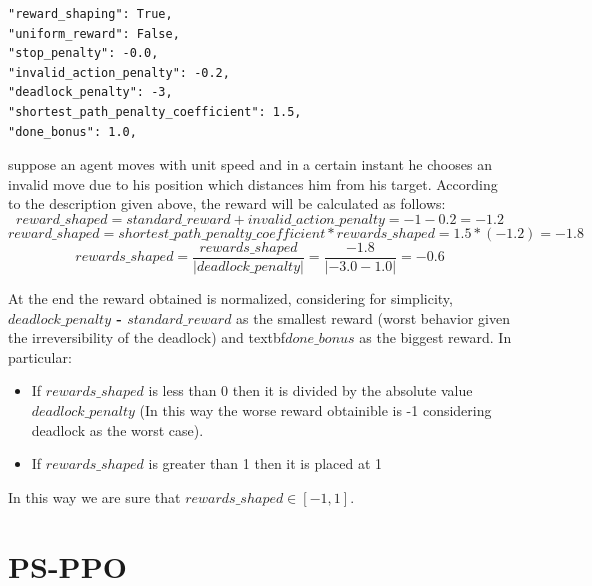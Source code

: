\documentclass[11pt, a4paper, hidelinks]{report}
\begin{document}
\begin{lstlisting}[label={lst:rewards-params}]
"reward_shaping": True,
"uniform_reward": False,
"stop_penalty": -0.0,
"invalid_action_penalty": -0.2,
"deadlock_penalty": -3,
"shortest_path_penalty_coefficient": 1.5,
"done_bonus": 1.0,
\end{lstlisting}

suppose an agent moves with unit speed and in a certain instant he chooses an invalid move due to his position which distances him from his target.
According to the description given above, the reward will be calculated as follows:
\begin{equation*}
reward\_shaped = standard\_reward + invalid\_action\_penalty = -1 -0.2 = -1.2
\end{equation*}
\begin{equation*}
reward\_shaped = shortest\_path\_penalty\_coefficient * rewards\_shaped = 1.5 * (-1.2)= -1.8
\end{equation*}
\begin{equation*}
rewards\_shaped = \frac{rewards\_shaped}{|deadlock\_penalty|} = \frac{-1.8}{|-3.0 - 1.0|} = -0.6
\end{equation*}

At the end the reward obtained is normalized, considering for simplicity,  \textbf{$deadlock\_penalty$ - $standard\_reward$} as the smallest reward (worst behavior given the irreversibility of the deadlock) and textbf{$done\_bonus$} as the biggest reward. In particular:

\begin{itemize}
	\item If $rewards\_shaped$ is less than 0 then it is divided by the absolute value $deadlock\_penalty$ (In this way the worse reward obtainible is -1 considering deadlock as the worst case).
	\item If $rewards\_shaped$ is greater than 1 then it is placed at 1 
\end{itemize}

In this way we are sure that $rewards\_shaped \in [-1, 1]$.

\section{PS-PPO}\label{sec:ps-ppo}
\end{document}
